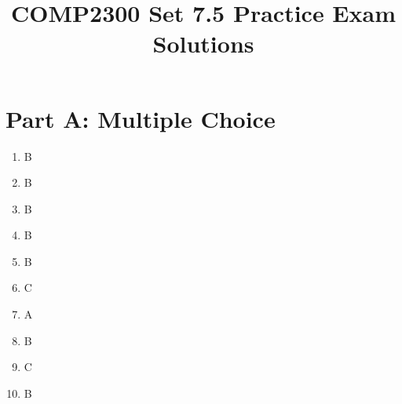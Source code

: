 \documentclass[11pt]{article}
\title{COMP2300 Set 7.5 Practice Exam Solutions}
\author{}
\date{}
\begin{document}
\maketitle

\section*{Part A: Multiple Choice}
\begin{enumerate}[label=\textbf{A\arabic*.}]
  \item B
  \item B
  \item B
  \item B
  \item B
  \item C
  \item A
  \item B
  \item C
  \item B
\end{enumerate}
\end{document}
